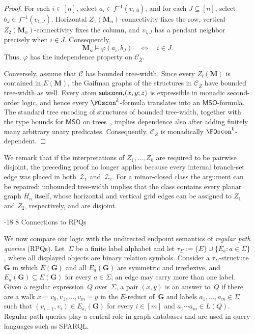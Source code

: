 \documentclass[1p,number,11pt]{elsarticle}
\makeatletter
\renewcommand\subsection{\@startsection{subsection}{2}{\z@}%
  {-18\p@ \@plus -4\p@ \@minus -4\p@}%
  {8\p@ \@plus 4\p@ \@minus 4\p@}%
  {\normalfont\normalsize\bfseries}}
\newcommand{\scon}{\hbox{\sf subconn}}
\renewcommand{\phi}{\varphi}
\theoremstyle{plain}
\newcommand{\Cc}{\mathscr{C}}
\newcommand{\MSO}{\ensuremath{\mathsf{MSO}}}
\makeatother
\begin{document}
\begin{proof}
For each $i\in[n]$, select $a_i\in f^{-1}(v_{i,\emptyset})$, and for each
$J\subseteq[n]$, select $b_J\in f^{-1}(v_{1,J})$. Horizontal
$Z_1(\mathbf M_n)$-connectivity fixes the row, vertical
$Z_2(\mathbf M_n)$-connectivity fixes the column, and $v_{i,J}$ has a
pendant neighbor precisely when $i\in J$. Consequently,
\[
   \mathbf M_n\models\phi(a_i,b_J)
   \quad\Longleftrightarrow\quad i\in J.
\]
Thus, $\phi$ has the independence property on $\Cc_{\bar Z}$.

Conversely, assume that $\Cc$ has bounded tree-width. Since every
$Z_i(\mathbf M)$ is contained in $E(\mathbf M)$, the Gaifman graphs of the
structures in $\Cc_{\bar Z}$ have bounded tree-width as well. Every atom $\scon_i(x,y;\bar z)$ is expressible in monadic second-order logic, and hence every $\FOscon^k$-formula translates into an $\MSO$-formula.
The standard tree encoding of structures of bounded tree-width, together with the type bounds for $\MSO$ on trees~\cite{paszke2020vc}, implies dependence also after adding finitely many arbitrary unary predicates.
Consequently, $\Cc_{\bar Z}$ is monadically $\FOscon^k$-dependent.
\end{proof}

We remark that if the interpretations of $Z_1,\ldots,Z_k$ are required to be pairwise
disjoint, the preceding proof no longer applies because every internal
branch-set edge was placed in both~$\mathcal Z_1$ and~$\mathcal Z_2$. For a
minor-closed class the argument can be repaired: unbounded tree-width implies
that the class contains every planar graph $H_n$ itself, whose horizontal and
vertical grid edges can be assigned to $Z_1$ and $Z_2$, respectively, and
are disjoint.

\subsection{Connections to RPQs}\label{sec-rpq}

We now compare our logic with the undirected endpoint semantics of \emph{regular path
queries} (RPQs).
Let~$\Sigma$ be a finite label alphabet and let
$\tau_\Sigma:=\{E\}\cup\{E_a:a\in\Sigma\}$, where all displayed objects are
binary relation symbols. Consider a $\tau_\Sigma$-structure $\mathbf G$ in
which $E(\mathbf G)$ and all $E_a(\mathbf G)$ are symmetric and irreflexive,
and $E_a(\mathbf G)\subseteq E(\mathbf G)$ for every $a\in\Sigma$; an edge
may carry more than one label. Given a regular expression~$Q$ over~$\Sigma$,
a pair $(x,y)$ is an answer to~$Q$ if there are a walk
$x=v_0,v_1,\ldots,v_m=y$ in the $E$-reduct of~$\mathbf G$ and labels
$a_1,\ldots,a_m\in\Sigma$ such that
$(v_{i-1},v_i)\in E_{a_i}(\mathbf G)$ for every $i\in[m]$ and
$a_1\cdots a_m\in L(Q)$. Regular path
queries play a central role in graph databases and are used in query
languages such as SPARQL.
\end{document}
